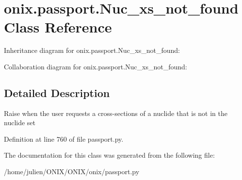 \hypertarget{classonix_1_1passport_1_1Nuc__xs__not__found}{}\section{onix.\+passport.\+Nuc\+\_\+xs\+\_\+not\+\_\+found Class Reference}
\label{classonix_1_1passport_1_1Nuc__xs__not__found}


Inheritance diagram for onix.\+passport.\+Nuc\+\_\+xs\+\_\+not\+\_\+found\+:


Collaboration diagram for onix.\+passport.\+Nuc\+\_\+xs\+\_\+not\+\_\+found\+:


\subsection{Detailed Description}
\begin{DoxyVerb}Raise when the user requests a cross-sections of a nuclide that is not in the nuclide set \end{DoxyVerb}
 

Definition at line 760 of file passport.\+py.



The documentation for this class was generated from the following file\+:\begin{DoxyCompactItemize}
\item 
/home/julien/\+O\+N\+I\+X/\+O\+N\+I\+X/onix/passport.\+py\end{DoxyCompactItemize}

